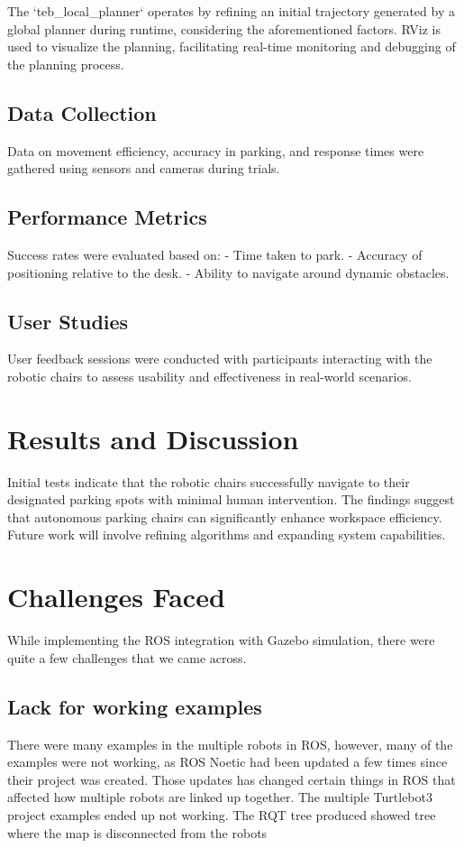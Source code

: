 \documentclass[a4paper,twocolumn]{article}
\begin{document}
The `teb\_local\_planner` operates by refining an initial trajectory generated by a global planner during runtime, considering the aforementioned factors. RViz is used to visualize the planning, facilitating real-time monitoring and debugging of the planning process.

\subsection{Data Collection}
Data on movement efficiency, accuracy in parking, and response times were gathered using sensors and cameras during trials.

\subsection{Performance Metrics}
Success rates were evaluated based on:
- Time taken to park.
- Accuracy of positioning relative to the desk.
- Ability to navigate around dynamic obstacles.

\subsection{User Studies}
User feedback sessions were conducted with participants interacting with the robotic chairs to assess usability and effectiveness in real-world scenarios.

\section{Results and Discussion}
Initial tests indicate that the robotic chairs successfully navigate to their designated parking spots with minimal human intervention. The findings suggest that autonomous parking chairs can significantly enhance workspace efficiency. Future work will involve refining algorithms and expanding system capabilities.

\section{Challenges Faced}
While implementing the ROS integration with Gazebo simulation, there were quite a few challenges that we came across. 
\subsection{Lack for working examples}
There were many examples in the multiple robots in ROS, however, many of the examples were not working, as ROS Noetic had been updated a few times since their project was created. Those updates has changed certain things in ROS that affected how multiple robots are linked up together. The multiple Turtlebot3 project examples ended up not working. The RQT tree produced showed tree where the map is disconnected from the robots 
\end{document}
